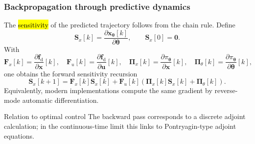\begin{frame}
	\frametitle{Backpropagation through predictive dynamics}
	The \hl{sensitivity} of the predicted trajectory follows from the chain rule. Define
	\begin{equation*}
		\bm{S}_{x}[k]=\frac{\partial \bm{x}_{\bm{\theta}}[k]}{\partial \bm{\theta}},
		\qquad
		\bm{S}_{x}[0]=\bm{0}.
	\end{equation*}\pause%
	With
	\begin{equation*}
		\bm{F}_{x}[k]=\frac{\partial \bm{f}_{\mathrm{d}}}{\partial\bm{x}}[k],\quad
		\bm{F}_{u}[k]=\frac{\partial \bm{f}_{\mathrm{d}}}{\partial\bm{u}}[k],\quad
		\bm{\Pi}_{x}[k]=\frac{\partial \pi_{\bm{\theta}}}{\partial\bm{x}}[k],\quad
		\bm{\Pi}_{\theta}[k]=\frac{\partial \pi_{\bm{\theta}}}{\partial\bm{\theta}}[k],
	\end{equation*}\pause%
	one obtains the forward sensitivity recursion
	\begin{equation*}
		\boxed{
			\bm{S}_{x}[k+1]
			=\bm{F}_{x}[k]\bm{S}_{x}[k]
			+\bm{F}_{u}[k]\left(\bm{\Pi}_{x}[k]\bm{S}_{x}[k]+\bm{\Pi}_{\theta}[k]\right).}
	\end{equation*}
	Equivalently, modern implementations compute the same gradient by reverse-mode automatic differentiation.\pause%
	\begin{block}{Relation to optimal control}
		The backward pass corresponds to a discrete adjoint calculation; in the continuous-time limit this links to Pontryagin-type adjoint equations.
	\end{block}
\end{frame}

